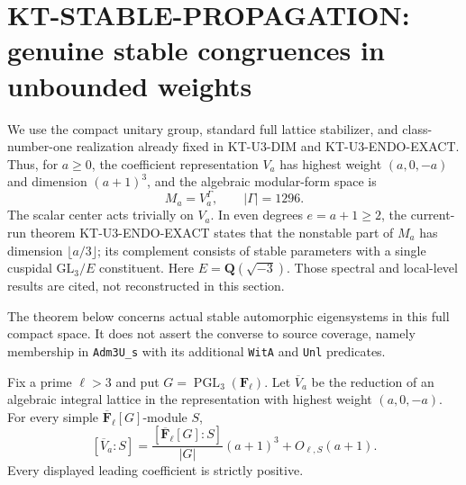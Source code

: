 \section{KT-STABLE-PROPAGATION: genuine stable congruences in unbounded weights}
\label{sec:kt-stable-propagation}

We use the compact unitary group, standard full lattice stabilizer,
and class-number-one realization already fixed in KT-U3-DIM and
KT-U3-ENDO-EXACT. Thus, for $a\geq0$, the coefficient representation
$V_a$ has highest weight $(a,0,-a)$ and dimension $(a+1)^3$, and
the algebraic modular-form space is
\[
                     M_a=V_a^{\Gamma},\qquad |\Gamma|=1296.
                                                               \tag{SP.1}
\]
The scalar center acts trivially on $V_a$. In even degrees
$e=a+1\geq2$, the current-run theorem KT-U3-ENDO-EXACT states that
the nonstable part of $M_a$ has dimension $\lfloor a/3\rfloor$;
its complement consists of stable parameters with a single
cuspidal $\mathrm{GL}_3/E$ constituent. Here
$E=\mathbf Q(\sqrt{-3})$. Those spectral and local-level results
are cited, not reconstructed in this section.

The theorem below concerns actual stable automorphic eigensystems
in this full compact space. It does not assert the converse to
source coverage, namely membership in \texttt{Adm3U\_s} with its
additional \texttt{WitA} and \texttt{Unl} predicates.

\begin{lemma}
Fix a prime $\ell>3$ and put $G=\operatorname{PGL}_3(\mathbf F_\ell)$.
Let $\overline V_a$ be the reduction of an algebraic integral
lattice in the representation with highest weight $(a,0,-a)$.
For every simple $\overline{\mathbf F}_\ell[G]$-module $S$,
\[
 [\overline V_a:S]
   =\frac{[\overline{\mathbf F}_\ell[G]:S]}{|G|}(a+1)^3+O_{\ell,S}(a+1).
                                                               \tag{SP.2}
\]
Every displayed leading coefficient is strictly positive.
\end{lemma}


